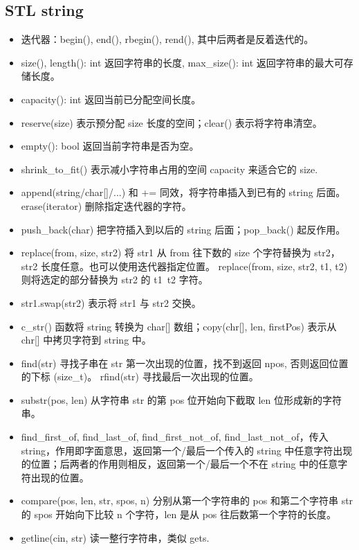 \subsection{STL string}
\begin{itemize}
    \item 迭代器：begin(), end(), rbegin(), rend(), 其中后两者是反着迭代的。
    \item size(), length(): int 返回字符串的长度, max\_size(): int 返回字符串的最大可存储长度。
    \item capacity(): int 返回当前已分配空间长度。
    \item reserve(size) 表示预分配 size 长度的空间；clear() 表示将字符串清空。
    \item empty(): bool 返回当前字符串是否为空。
    \item shrink\_to\_fit() 表示减小字符串占用的空间 capacity 来适合它的 size.
    \item append(string/char[]/...) 和 += 同效，将字符串插入到已有的 string 后面。erase(iterator) 删除指定迭代器的字符。
    \item push\_back(char) 把字符插入到以后的 string 后面；pop\_back() 起反作用。
    \item replace(from, size, str2) 将 str1 从 from 往下数的 size 个字符替换为 str2，str2 长度任意。也可以使用迭代器指定位置。 replace(from, size, str2, t1, t2)  则将选定的部分替换为 str2 的 t1~t2 字符。
    \item str1.swap(str2) 表示将 str1 与 str2 交换。
    \item c\_str() 函数将 string 转换为 char[] 数组；copy(chr[], len, firstPos) 表示从 chr[] 中拷贝字符到 string 中。
    \item find(str) 寻找子串在 str 第一次出现的位置，找不到返回 npos, 否则返回位置的下标 (size\_t)。 rfind(str) 寻找最后一次出现的位置。
    \item substr(pos, len) 从字符串 str 的第 pos 位开始向下截取 len 位形成新的字符串。
    \item find\_first\_of, find\_last\_of, find\_first\_not\_of, find\_last\_not\_of，传入 string，作用即字面意思，返回第一个/最后一个传入的 string 中任意字符出现的位置；后两者的作用则相反，返回第一个/最后一个不在 string 中的任意字符出现的位置。
    \item compare(pos, len, str, spos, n) 分别从第一个字符串的 pos 和第二个字符串 str 的 spos 开始向下比较 n 个字符，len 是从 pos 往后数第一个字符的长度。
    \item getline(cin, str) 读一整行字符串，类似 gets.
\end{itemize}